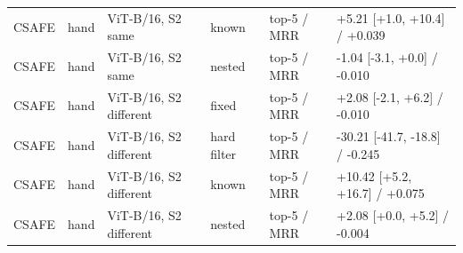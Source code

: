{\begin{longtable}{llllll}
CSAFE & hand & ViT-B/16, S2 same & known & top-5 / MRR & +5.21 [+1.0, +10.4] / +0.039 \\
CSAFE & hand & ViT-B/16, S2 same & nested & top-5 / MRR & -1.04 [-3.1, +0.0] / -0.010 \\
CSAFE & hand & ViT-B/16, S2 different & fixed & top-5 / MRR & +2.08 [-2.1, +6.2] / -0.010 \\
CSAFE & hand & ViT-B/16, S2 different & hard filter & top-5 / MRR & -30.21 [-41.7, -18.8] / -0.245 \\
CSAFE & hand & ViT-B/16, S2 different & known & top-5 / MRR & +10.42 [+5.2, +16.7] / +0.075 \\
CSAFE & hand & ViT-B/16, S2 different & nested & top-5 / MRR & +2.08 [+0.0, +5.2] / -0.004 \\
\bottomrule
\end{longtable}
}
